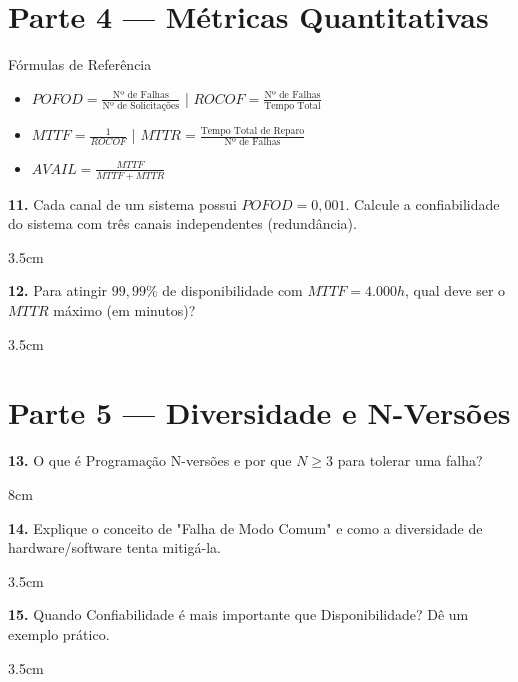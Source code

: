 \documentclass[12pt,a4paper,twoside]{report}
\begin{document}
\newpage

\section*{Parte 4 — Métricas Quantitativas}

\begin{block}{Fórmulas de Referência}
    \small
    \begin{itemize}
        \item $POFOD = \frac{\text{Nº de Falhas}}{\text{Nº de Solicitações}}$ \quad | \quad $ROCOF = \frac{\text{Nº de Falhas}}{\text{Tempo Total}}$
        \item $MTTF = \frac{1}{ROCOF}$ \quad | \quad $MTTR = \frac{\text{Tempo Total de Reparo}}{\text{Nº de Falhas}}$
        \item $AVAIL = \frac{MTTF}{MTTF + MTTR}$
    \end{itemize}
\end{block}

\textbf{11.} Cada canal de um sistema possui $POFOD = 0,001$. Calcule a confiabilidade do sistema com três canais independentes (redundância).
\begin{resposta}{3.5cm}
\end{resposta}

\textbf{12.} Para atingir $99,99\%$ de disponibilidade com $MTTF = 4.000h$, qual deve ser o $MTTR$ máximo (em minutos)?
\begin{resposta}{3.5cm}
\end{resposta}

\section*{Parte 5 — Diversidade e N-Versões}

\textbf{13.} O que é Programação N-versões e por que $N \ge 3$ para tolerar uma falha?
\begin{resposta}{8cm}
\end{resposta}

\textbf{14.} Explique o conceito de "Falha de Modo Comum" e como a diversidade de hardware/software tenta mitigá-la.
\begin{resposta}{3.5cm}
\end{resposta}

\textbf{15.} Quando Confiabilidade é mais importante que Disponibilidade? Dê um exemplo prático.
\begin{resposta}{3.5cm}
\end{resposta}
\end{document}
